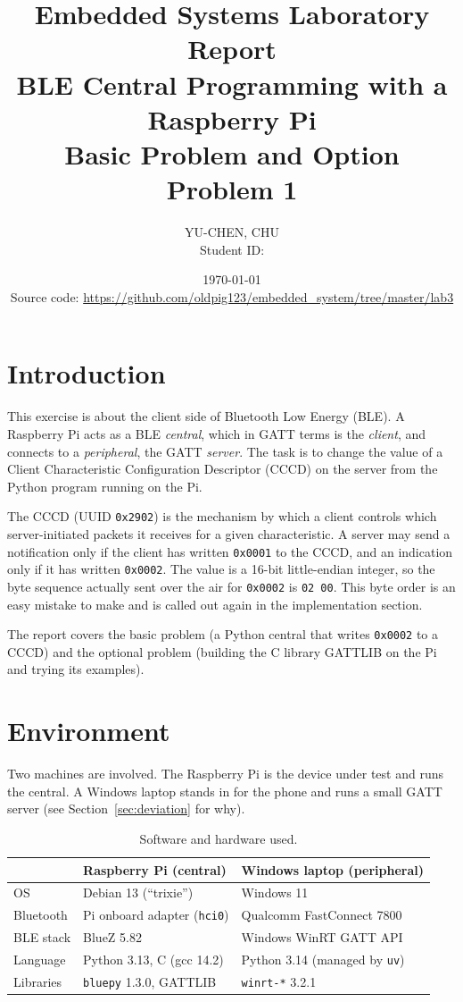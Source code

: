 \documentclass[11pt,a4paper]{article}
\title{Embedded Systems Laboratory Report\\
       \large BLE Central Programming with a Raspberry Pi\\
       \normalsize Basic Problem and Option Problem 1}
\author{YU-CHEN, CHU\\
        \normalsize Student ID: \studentid}
\date{\today\\[2ex]
      \normalsize Source code:
      \url{https://github.com/oldpig123/embedded_system/tree/master/lab3}}
\begin{document}
\maketitle
\tableofcontents
\newpage

\section{Introduction}

This exercise is about the client side of Bluetooth Low Energy (BLE). A
Raspberry Pi acts as a BLE \emph{central}, which in GATT terms is the
\emph{client}, and connects to a \emph{peripheral}, the GATT \emph{server}.
The task is to change the value of a Client Characteristic Configuration
Descriptor (CCCD) on the server from the Python program running on the Pi.

The CCCD (UUID \texttt{0x2902}) is the mechanism by which a client controls
which server-initiated packets it receives for a given characteristic. A
server may send a notification only if the client has written \texttt{0x0001}
to the CCCD, and an indication only if it has written \texttt{0x0002}. The
value is a 16-bit little-endian integer, so the byte sequence actually sent
over the air for \texttt{0x0002} is \texttt{02 00}. This byte order is an easy
mistake to make and is called out again in the implementation section.

The report covers the basic problem (a Python central that writes
\texttt{0x0002} to a CCCD) and the optional problem (building the C library
GATTLIB on the Pi and trying its examples).

\section{Environment}

Two machines are involved. The Raspberry Pi is the device under test and runs
the central. A Windows laptop stands in for the phone and runs a small GATT
server (see Section~\ref{sec:deviation} for why).

\begin{table}[h]
\centering
\caption{Software and hardware used.}
\begin{tabular}{@{}lll@{}}
\toprule
 & Raspberry Pi (central) & Windows laptop (peripheral) \\
\midrule
OS            & Debian 13 (``trixie'')           & Windows 11 \\
Bluetooth     & Pi onboard adapter (\texttt{hci0}) & Qualcomm FastConnect 7800 \\
BLE stack     & BlueZ 5.82                       & Windows WinRT GATT API \\
Language      & Python 3.13, C (gcc 14.2)        & Python 3.14 (managed by \texttt{uv}) \\
Libraries     & \texttt{bluepy} 1.3.0, GATTLIB    & \texttt{winrt-*} 3.2.1 \\
\bottomrule
\end{tabular}
\end{table}
\end{document}
